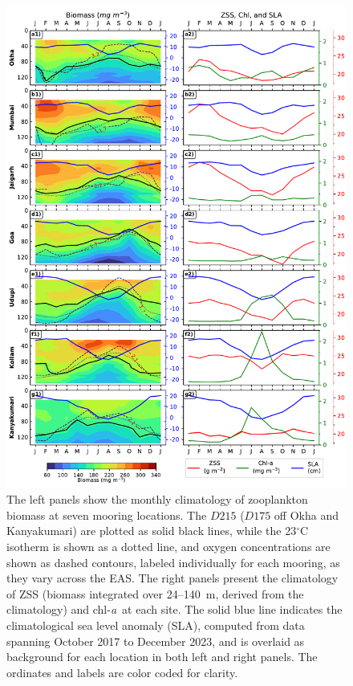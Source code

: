 \documentclass[authoryear,review,11pt]{elsarticle}
\newcommand{\chla}{chl-{\emph{a}}}
\begin{document}
\begin{figure}[htbp]
	\centering
	\includegraphics[width=\textwidth]{./fig_05_biomass_ss_chl_climatology.pdf} 
	\captionsetup{justification=justified,font=footnotesize,skip=0.05\baselineskip,width=\textwidth}
	\caption{The left panels show the monthly climatology of zooplankton biomass at seven mooring locations. The $D215$ ($D175$ off Okha and Kanyakumari) are plotted as solid black lines, while the 23$^{\circ}$C isotherm is shown as a dotted line, and oxygen concentrations are shown as dashed contours, labeled individually for each mooring, as they vary across the EAS. The right panels present the climatology of ZSS (biomass integrated over 24--140~m, derived from the climatology) and \chla\ at each site. The solid blue line indicates the climatological sea level anomaly (SLA), computed from data spanning October 2017 to December 2023, and is overlaid as background for each location in both left and right panels. The ordinates and labels are color coded for clarity.}
	\label{fig:biomass_ss_chl_climatology}
\end{figure}
\end{document}
